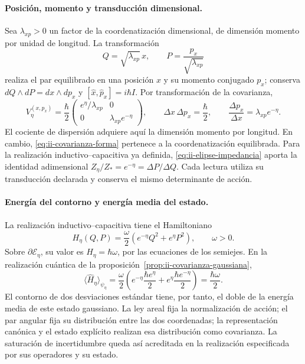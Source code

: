 \paragraph{Posición, momento y transducción dimensional.}
Sea \(\lambda_{xp}>0\) un factor de la coordenatización dimensional, de dimensión
momento por unidad de longitud. La transformación
\[
 Q=\sqrt{\lambda_{xp}}\,x,\qquad
 P=\frac{p_x}{\sqrt{\lambda_{xp}}}
\]
realiza el par equilibrado en una posición \(x\) y su momento conjugado
\(p_x\); conserva \(dQ\wedge dP=dx\wedge dp_x\) y
\([\widehat x,\widehat p_x]=i\hbar I\). Por transformación de la
covarianza,
\begin{equation}
 V_\eta^{(x,p_x)}=\frac{\hbar}{2}
 \begin{pmatrix}e^\eta/\lambda_{xp}&0\\
                 0&\lambda_{xp}e^{-\eta}\end{pmatrix},\qquad
 \Delta x\,\Delta p_x=\frac{\hbar}{2},\qquad
 \frac{\Delta p_x}{\Delta x}=\lambda_{xp}e^{-\eta}.
 \label{eq:ii-covarianza-dimensiones}
\end{equation}
El cociente de dispersión adquiere aquí la dimensión momento por longitud.
En cambio, \eqref{eq:ii-covarianza-forma} pertenece a la coordenatización equilibrada.
Para la realización inductivo--capacitiva ya definida,
\eqref{eq:ii-elipse-impedancia} aporta la identidad adimensional
\(Z_\eta/Z_*=e^{-\eta}=\Delta P/\Delta Q\).
Cada lectura utiliza su transducción declarada y conserva el mismo
determinante de acción.

\paragraph{Energía del contorno y energía media del estado.}
La realización inductivo--capacitiva tiene el Hamiltoniano
\[
 H_\eta(Q,P)=\frac{\omega}{2}
 \left(e^{-\eta}Q^2+e^\eta P^2\right),\qquad \omega>0.
\]
Sobre \(\partial\mathcal E_\eta\), su valor es
\(H_\eta=\hbar\omega\), por las ecuaciones de los semiejes. En la
realización cuántica de la proposición~\ref{prop:ii-covarianza-gaussiana},
\begin{equation}
 \langle\widehat H_\eta\rangle_{\psi_\eta}
 =\frac{\omega}{2}
 \left(e^{-\eta}\frac{\hbar e^\eta}{2}
       +e^\eta\frac{\hbar e^{-\eta}}{2}\right)
 =\frac{\hbar\omega}{2}.
 \label{eq:ii-energia-contorno-covarianza}
\end{equation}
El contorno de dos desviaciones estándar tiene, por tanto, el doble de la
energía media de este estado gaussiano. La ley areal fija la normalización
de acción; el par angular fija su distribución entre las dos coordenadas;
la representación canónica y el estado explícito realizan esa distribución
como covarianza. La saturación de incertidumbre queda así acreditada en
la realización especificada por sus operadores y su estado.
